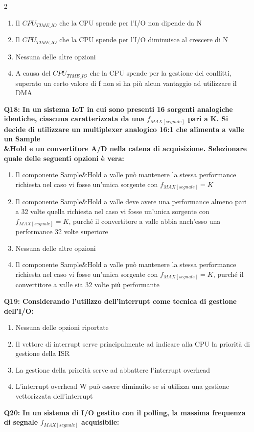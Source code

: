 \documentclass[10pt]{article}
\begin{document}
\begin{multicols}{2}
\begin{enumerate}[label=\arabic*.]
\item Il $CPU_{TIME\_IO}$ che la CPU spende per l’I/O non dipende da N
\item Il $CPU_{TIME\_IO}$ che la CPU spende per l’I/O diminuisce al crescere di N
\item Nessuna delle altre opzioni
\item A causa del $CPU_{TIME\_IO}$ che la CPU spende per la gestione dei conflitti, superato un certo valore di f non si ha più alcun vantaggio ad utilizzare il DMA
\end{enumerate}
\textbf{Q18: In un sistema IoT in cui sono presenti 16 sorgenti analogiche identiche, ciascuna caratterizzata da una $f_{MAX[segnale]}$ pari a K. Si decide di utilizzare un multiplexer analogico 16:1 che alimenta a valle un Sample\\\&Hold e un convertitore A/D nella catena di acquisizione. Selezionare quale delle seguenti opzioni è vera:}

\begin{enumerate}[label=\arabic*.]
\item Il componente Sample\&Hold a valle può mantenere la stessa performance richiesta nel caso vi fosse un'unica sorgente con $f_{MAX[segnale]} = K$
\item Il componente Sample\&Hold a valle deve avere una performance almeno pari a 32 volte quella richiesta nel caso vi fosse un'unica sorgente con $f_{MAX[segnale]} = K$, purché il convertitore a valle abbia anch’esso una performance 32 volte superiore
\item Nessuna delle altre opzioni
\item Il componente Sample\&Hold a valle può mantenere la stessa performance richiesta nel caso vi fosse un'unica sorgente con $f_{MAX[segnale]} = K$, purché il convertitore a valle sia 32 volte più performante
\end{enumerate}
\textbf{Q19: Considerando l’utilizzo dell’interrupt come tecnica di gestione dell’I/O:}

\begin{enumerate}[label=\arabic*.]
\item Nessuna delle opzioni riportate
\item Il vettore di interrupt serve principalmente ad indicare alla CPU la priorità di gestione della ISR
\item La gestione della priorità serve ad abbattere l’interrupt overhead
\item L’interrupt overhead W può essere diminuito se si utilizza una gestione vettorizzata dell’interrupt
\end{enumerate}
\textbf{Q20: In un sistema di I/O gestito con il polling, la massima frequenza di segnale $f_{MAX[segnale]}$ acquisibile:}


\end{multicols}
\end{document}
